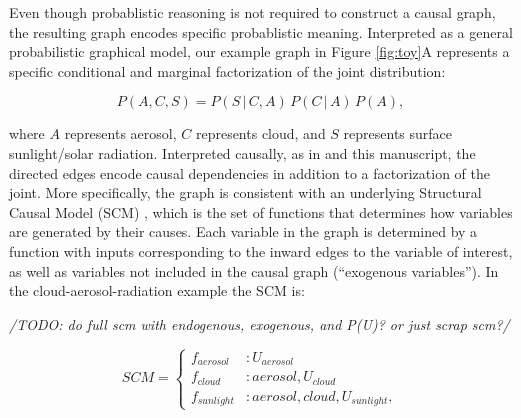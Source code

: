 \documentclass[12pt]{article}
\begin{document}
Even though probablistic reasoning is not required to construct a
causal graph, the resulting graph encodes specific probablistic
meaning. Interpreted as a general probabilistic graphical model, our
example graph in Figure \ref{fig:toy}A represents a specific
conditional and marginal factorization of the joint distribution:

\begin{equation}
  P(A, C, S) = P(S \, | \,C, A) \, P(C \, | \, A) \, P(A),
\end{equation}

where $A$ represents aerosol, $C$ represents cloud, and $S$ represents
surface sunlight/solar radiation. Interpreted causally, as in
\citet{pearl1995causal} and this manuscript, the directed edges encode
causal dependencies in addition to a factorization of the joint. More
specifically, the graph is consistent with an underlying Structural
Causal Model (SCM) \citep[][]{pearl2009}, which is the set of
functions that determines how variables are generated by their
causes. Each variable in the graph is determined by a function with
inputs corresponding to the inward edges to the variable of interest,
as well as variables not included in the causal graph (``exogenous
variables'').  In the cloud-aerosol-radiation example the SCM is:

\emph{/TODO: do full scm with endogenous, exogenous, and P(U)? or just
  scrap scm?/}

\begin{equation}
  SCM =
  \begin{cases}
    f_{aerosol} &: U_{aerosol} \\
    f_{cloud} &: aerosol, U_{cloud}  \\
    f_{sunlight} &: aerosol, cloud, U_{sunlight},
  \end{cases}
  \label{eq:1}
\end{equation}
\end{document}
